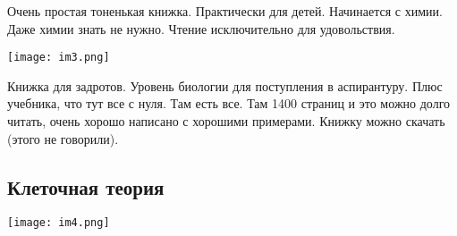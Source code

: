 Очень простая тоненькая книжка. Практически для детей. Начинается 
с химии. Даже химии знать не нужно. Чтение исключительно для 
удовольствия. 

\texttt{[image: im3.png]}

Книжка для задротов. Уровень биологии для поступления в аспирантуру.
Плюс учебника, что тут все с нуля. Там есть все. Там 1400 страниц
и это можно долго читать, очень хорошо написано с хорошими примерами.
Книжку можно скачать (этого не говорили).   

\subsection{Клеточная теория}

\texttt{[image: im4.png]}

